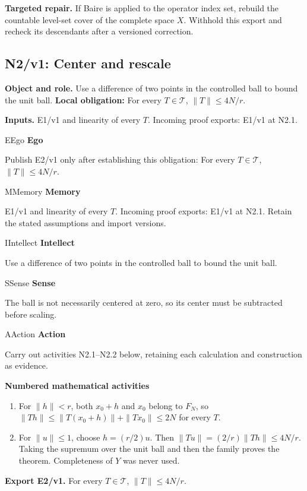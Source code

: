 \documentclass[preprint,12pt,aps,pra,showkeys,amsmath,amssymb,superscriptaddress,floatfix]{revtex4-2}
\theoremstyle{definition}
\theoremstyle{remark}
\newcommand{\mmfaculty}[3]{%
 \begin{mmfacultybox}{#1}{#2}
 {\sffamily\bfseries\color{MMBlue}#2}\par\smallskip #3
 \end{mmfacultybox}}
\newcommand{\field}[2]{\par\smallskip\noindent\textbf{#1.} #2\par}
\begin{document}
\field{Targeted repair}{If Baire is applied to the operator index set, rebuild the countable
level-set cover of the complete space \(X\). Withhold this export and
recheck its descendants after a versioned correction.}

\clearpage

\subsection{N2/v1: Center and rescale}

\field{Object and role}{Use a difference of two points in the controlled ball to bound the unit
ball. \textbf{Local obligation:} For every \(T\in\mathcal T\),
\(\|T\|\le4N/r\).}

\field{Inputs}{E1/v1 and linearity of every \(T\). Incoming proof exports: E1/v1 at
N2.1.}

\mmfaculty{E}{Ego}{Publish E2/v1 only after establishing this obligation: For every
\(T\in\mathcal T\), \(\|T\|\le4N/r\).}

\mmfaculty{M}{Memory}{E1/v1 and linearity of every \(T\). Incoming proof exports: E1/v1 at
N2.1. Retain the stated assumptions and import versions.}

\mmfaculty{I}{Intellect}{Use a difference of two points in the controlled ball to bound the unit
ball.}

\mmfaculty{S}{Sense}{The ball is not necessarily centered at zero, so its center must be
subtracted before scaling.}

\mmfaculty{A}{Action}{Carry out activities N2.1--N2.2 below, retaining each calculation and
construction as evidence.}

\smallskip\noindent\textbf{Numbered mathematical activities}

\begin{enumerate}[label=N2.\arabic*,leftmargin=3.4em]

\item For \(\|h\|<r\), both \(x_0+h\) and \(x_0\) belong to \(F_N\), so
\(\|Th\|\le\|T(x_0+h)\|+\|Tx_0\|\le2N\) for every \(T\).

\item For \(\|u\|\le1\), choose \(h=(r/2)u\). Then
\(\|Tu\|=(2/r)\|Th\|\le4N/r\). Taking the supremum over the unit ball
and then the family proves the theorem. Completeness of \(Y\) was never
used.

\end{enumerate}

\field{Export E2/v1}{For every \(T\in\mathcal T\), \(\|T\|\le4N/r\).}
\end{document}
